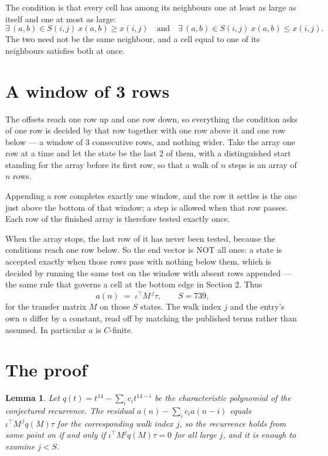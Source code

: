 \documentclass[11pt,a4paper]{article}
\theoremstyle{plain}
\newtheorem{lemma}[theorem]{Lemma}
\theoremstyle{definition}
\begin{document}
The condition is that every cell has among its neighbours one at least as large as itself and one at most as large:
\[
\exists\,(a,b)\in S(i,j)\ x(a,b)\ge x(i,j)\quad\text{and}\quad\exists\,(a,b)\in S(i,j)\ x(a,b)\le x(i,j).
\]
The two need not be the same neighbour, and a cell equal to one of its neighbours satisfies both at once.

\section{A window of 3 rows}

The offsets reach one row up and one row down, so everything the condition asks of one row is
decided by that row together with one row above it and one row below --- a window of
$3$ consecutive rows, and nothing wider. Take the array one row at a time and
let the state be the last 2 of them, with a distinguished start standing for the array before its
first row, so that a walk of $n$ steps is an array of $n$ rows.

Appending a row completes exactly one window, and the row it settles is the one just above the bottom of that window; a step is
allowed when that row passes. Each row of the finished array is therefore tested exactly once.

When the array stops, the last row of it has never been tested, because the
conditions reach one row below. So the end vector is NOT all ones: a state is accepted exactly when
those rows pass with nothing below them, which is decided by running the same test on the window
with absent rows appended --- the same rule that governs a cell at the bottom edge in
Section 2.
Thus
\[
a(n)\;=\;\iota^{\!\top}M^{\,j}\tau ,\qquad S=739,
\]
for the transfer matrix $M$ on those $S$ states. The walk index $j$ and the entry's own $n$
differ by a constant, read off by matching the published terms rather than assumed. In
particular $a$ is $C$-finite.

\section{The proof}

\begin{lemma}\label{lem:crit}
Let $q(t)=t^{14}-\sum_i c_it^{14-i}$ be the characteristic polynomial of the
conjectured recurrence. The residual $a(n)-\sum_ic_ia(n-i)$ equals
$\iota^{\!\top}M^{\,j}q(M)\tau$ for the corresponding walk index $j$, so the recurrence
holds from some point on if and only if $\iota^{\!\top}M^{j}q(M)\tau=0$ for all large $j$,
and it is enough to examine $j<S$.
\end{lemma}
\end{document}
